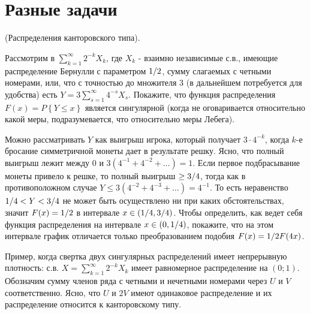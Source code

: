 \section{Разные задачи}

\begin{problem}
(Распределения канторовского типа).

Рассмотрим в $\sum _{k=1}^{\infty }2^{-k} X_{k}  $, где $X_{k} $ - взаимно независимые с.в., имеющие распределение Бернулли с параметром ${1\mathord{\left/ {\vphantom {1 2}} \right. \kern-\nulldelimiterspace} 2} $, сумму слагаемых с четными номерами, или, что с точностью до множителя 3 (в дальнейшем потребуется для удобства) есть $Y=3\sum _{s=1}^{\infty }4^{-s} X_{s}  $. Покажите, что функция распределения $F(x)=P\left\{Y\le x\right\}$ является сингулярной (когда не оговаривается относительно какой меры, подразумевается, что относительно меры Лебега).


\begin{ordre}
Можно рассматривать $Y$ как выигрыш игрока, который получает $3\cdot 4^{-k} $, когда $k$-е бросание симметричной монеты дает в результате решку. Ясно, что полный выигрыш лежит между 0 и $3\left(4^{-1} +4^{-2} +\ldots \right)=1$. Если первое подбрасывание монеты привело к решке, то полный выигрыш $\ge {3\mathord{\left/ {\vphantom {3 4}} \right. \kern-\nulldelimiterspace} 4} $, тогда как в противоположном случае $Y\le 3\left(4^{-2} +4^{-3} +\ldots \right)=4^{-1} $. То есть неравенство ${1\mathord{\left/ {\vphantom {1 4}} \right. \kern-\nulldelimiterspace} 4} <Y<{3\mathord{\left/ {\vphantom {3 4}} \right. \kern-\nulldelimiterspace} 4} $ не может быть осуществлено ни при каких обстоятельствах, значит $F(x)={1\mathord{\left/ {\vphantom {1 2}} \right. \kern-\nulldelimiterspace} 2} $ в интервале $x\in \left({1\mathord{\left/ {\vphantom {1 4}} \right. \kern-\nulldelimiterspace} 4} ,{3\mathord{\left/ {\vphantom {3 4}} \right. \kern-\nulldelimiterspace} 4} \right)$. Чтобы определить, как ведет себя функция распределения на интервале $x\in \left(0,{1\mathord{\left/ {\vphantom {1 4}} \right. \kern-\nulldelimiterspace} 4} \right)$, покажите, что на этом интервале график отличается только преобразованием подобия $F(x)={1\mathord{\left/ {\vphantom {1 2}} \right. \kern-\nulldelimiterspace} 2} F(4x)$.
\end{ordre}

\begin{remark}
Пример, когда свертка двух сингулярных распределений имеет непрерывную плотность: с.в. $X=\sum _{k=1}^{\infty }2^{-k} X_{k}  $ имеет равномерное распределение на $\left(0;1\right)$. Обозначим сумму членов ряда с четными и нечетными номерами через $U$ и $V$ соответственно. Ясно, что $U$ и $2V$ имеют одинаковое распределение и их распределение относится к канторовскому типу.
\end{remark}

\end{problem}


